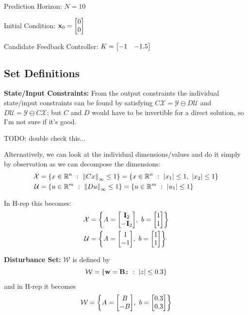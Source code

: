 \documentclass[]{article}
\newcommand{\R}{\mathbb{R}}
\newcommand{\st}{\ : \ }
\begin{document}
Prediction Horizon:
$N = 10$

Initial Condition:
$\vb{x}_0 = \mqty[0\\0]$

Candidate Feedback Controller:
$K = \mqty[-1 & -1.5]$

\subsection{Set Definitions}
\textbf{State/Input Constraints:}
From the output constraints the individual state/input constraints can be found by satisfying
$C \mathcal{X} = \mathcal{Y} \ominus D \mathcal{U}$
and 
$D \mathcal{U} = \mathcal{Y} \ominus C \mathcal{X}$;
but $C$ and $D$ would have to be invertible for a direct solution, so I'm not sure if it's good.

TODO: double check this...

Alternatively, we can look at the individual dimensions/values and do it simply by observation as we can decompose the dimensions:
\begin{equation}
    \begin{aligned}
        \mathcal{X} &= \{x \in \R^n \st \norm{C x}_\infty \leq 1\} 
            = \{x \in \R^n \st \abs{x_1} \leq 1, \ \abs{x_2} \leq 1\}\\
        \mathcal{U} &= \{u \in \R^m \st \norm{D u}_\infty \leq 1\}
            = \{u \in \R^m \st \abs{u_1} \leq 1\}
    \end{aligned}
\end{equation}

In H-rep this becomes:
\begin{equation}
    \begin{aligned}
        \mathcal{X} &= \qty{A = \mqty[\vb{I}_2\\-\vb{I}_2], \ b = \mqty[1\\1]}\\
        \mathcal{U} &= \qty{A = \mqty[1\\-1], \ b = \mqty[1\\1]}
    \end{aligned}
\end{equation}

\textbf{Disturbance Set:}
$\mathcal{W}$ is defined by 
\begin{equation}
    \mathcal{W} = \{\vb{w} = \mathbf{B} z \st \abs{z} \leq 0.3\}
\end{equation}
and in H-rep it becomes
\begin{equation}
    \mathcal{W} = \qty{A = \mqty[B\\-B], \ b = \mqty[0.3\\0.3]}
\end{equation}
\end{document}
